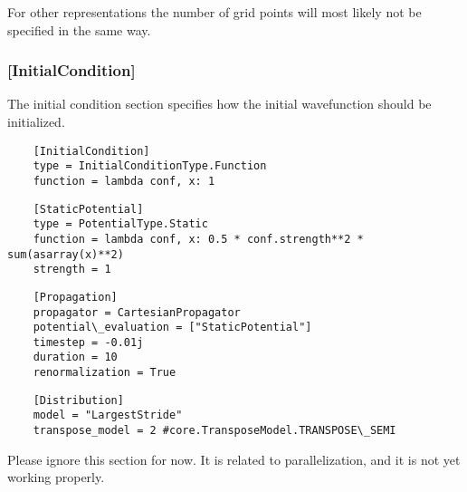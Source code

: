 \documentclass[a4paper,12pt]{report}
\begin{document}
For other representations the number of grid points will most likely not be specified in the same way.

\subsubsection*{[InitialCondition]}
The initial condition section specifies how the initial wavefunction should be initialized.
\begin{verbatim}
	[InitialCondition]
	type = InitialConditionType.Function
	function = lambda conf, x: 1
\end{verbatim}


\begin{verbatim}
	[StaticPotential]
	type = PotentialType.Static
	function = lambda conf, x: 0.5 * conf.strength**2 * sum(asarray(x)**2) 
	strength = 1
\end{verbatim}

\begin{verbatim}
	[Propagation]
	propagator = CartesianPropagator
	potential\_evaluation = ["StaticPotential"]
	timestep = -0.01j
	duration = 10
	renormalization = True
\end{verbatim}

\begin{verbatim}
	[Distribution]
	model = "LargestStride"
	transpose_model = 2 #core.TransposeModel.TRANSPOSE\_SEMI
\end{verbatim}
Please ignore this section for now. It is related to parallelization, and it is not yet working
properly.



\end{document}
